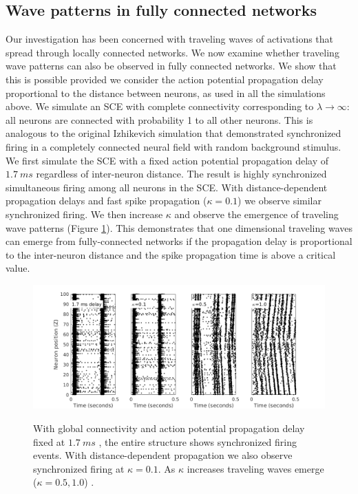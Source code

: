 \documentclass[12pt]{article}
\begin{document}
\FloatBarrier

\subsection{Wave patterns in fully connected networks} \label{sub:delay}
Our investigation has been concerned with traveling waves of activations that spread through locally connected networks.
We now examine whether traveling wave patterns can also be observed in fully connected networks.
We show that this is possible provided we consider the action potential propagation delay proportional to the distance between neurons, as used in all the simulations above.
We simulate an SCE with complete connectivity corresponding to $\lambda \rightarrow \infty$: all neurons are connected with probability 1 to all other neurons.
This is analogous to the original Izhikevich simulation \parencite{izhikevich2003} that demonstrated synchronized firing in a completely connected neural field with random background stimulus.
We first simulate the SCE with a fixed action potential propagation delay of \color{red}$1.7~ms$ \parencite{Markram1997} \color{black} regardless of inter-neuron distance.
The result is highly synchronized simultaneous firing among all neurons in the SCE.
\color{red} 
With distance-dependent propagation delays and fast spike propagation ($\kappa=0.1$) we observe similar synchronized firing.
We then increase $\kappa$ and observe the emergence of traveling wave patterns (Figure \ref{fig:delay_waves}). \color{black}
This demonstrates that one dimensional traveling waves can emerge from fully-connected networks if the propagation delay is proportional to the inter-neuron distance \color{red}and the spike propagation time is above a critical value\color{black}.
\begin{figure}[!htb]
 \caption{With global connectivity and action potential propagation delay \color{red}fixed at $1.7~ms$ \color{black}, the entire structure shows synchronized firing events.
          \color{red}
          With distance-dependent propagation we also observe synchronized firing at $\kappa=0.1$.
          As $\kappa$ increases traveling waves emerge ($\kappa=0.5, 1.0$) \color{black}.}
 \centering
   \includegraphics[width=\textwidth]{fig/DelayWaves}  
 \label{fig:delay_waves}
\end{figure}
\end{document}
